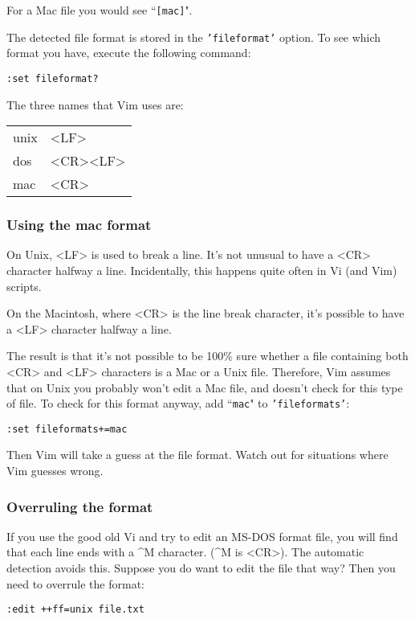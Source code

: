 For a Mac file you would see ``\texttt{[mac]}".

The detected file format is stored in the \texttt{'fileformat'} option.
To see which format you have, execute the following command:

\begin{Verbatim}[samepage=true]
 :set fileformat?
\end{Verbatim}

The three names that Vim uses are:
\begin{center} \begin{tabular}{l l}
				unix & <LF> \\
				dos & <CR><LF> \\
				mac & <CR>
\end{tabular} \end{center}
\subsubsection{Using the mac format}
On Unix, <LF> is used to break a line.
It's not unusual to have a <CR> character halfway a line.
Incidentally, this happens quite often in Vi (and Vim) scripts.

On the Macintosh, where <CR> is the line break character, it's possible to have a <LF> character halfway a line.

The result is that it's not possible to be 100\% sure whether a file containing both <CR> and <LF> characters is a Mac or a Unix file.
Therefore, Vim assumes that on Unix you probably won't edit a Mac file, and doesn't check for this type of file.
To check for this format anyway, add ``\texttt{mac}" to \texttt{'fileformats'}:

\begin{Verbatim}[samepage=true]
 :set fileformats+=mac
\end{Verbatim}

Then Vim will take a guess at the file format.
Watch out for situations where Vim guesses wrong.
\subsubsection{Overruling the format}
If you use the good old Vi and try to edit an MS-DOS format file, you will find that each line ends with a \textasciicircum M character.
(\textasciicircum M is <CR>).
The automatic detection avoids this.
Suppose you do want to edit the file that way?  Then you need to overrule the format:

\begin{Verbatim}[samepage=true]
 :edit ++ff=unix file.txt
\end{Verbatim}

